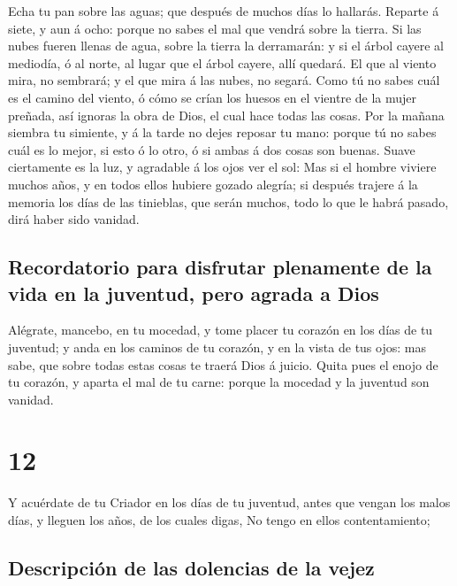  Echa tu pan sobre las aguas; que después de muchos días
lo hallarás.  Reparte á siete, y aun á ocho: porque no
sabes el mal que vendrá sobre la tierra.  Si las nubes
fueren llenas de agua, sobre la tierra la derramarán: y si el árbol
cayere al mediodía, ó al norte, al lugar que el árbol cayere, allí
quedará.  El que al viento mira, no sembrará; y el que
mira á las nubes, no segará.  Como tú no sabes cuál es el
camino del viento, ó cómo se crían los huesos en el vientre de la mujer
preñada, así ignoras la obra de Dios, el cual hace todas las cosas.
 Por la mañana siembra tu simiente, y á la tarde no dejes
reposar tu mano: porque tú no sabes cuál es lo mejor, si esto ó lo otro,
ó si ambas á dos cosas son buenas.  Suave ciertamente es
la luz, y agradable á los ojos ver el sol:  Mas si el
hombre viviere muchos años, y en todos ellos hubiere gozado alegría; si
después trajere á la memoria los días de las tinieblas, que serán
muchos, todo lo que le habrá pasado, dirá haber sido vanidad.

\hypertarget{recordatorio-para-disfrutar-plenamente-de-la-vida-en-la-juventud-pero-agrada-a-dios}{%
\subsection{Recordatorio para disfrutar plenamente de la vida en la
juventud, pero agrada a
Dios}\label{recordatorio-para-disfrutar-plenamente-de-la-vida-en-la-juventud-pero-agrada-a-dios}}

 Alégrate, mancebo, en tu mocedad, y tome placer tu
corazón en los días de tu juventud; y anda en los caminos de tu corazón,
y en la vista de tus ojos: mas sabe, que sobre todas estas cosas te
traerá Dios á juicio.  Quita pues el enojo de tu corazón,
y aparta el mal de tu carne: porque la mocedad y la juventud son
vanidad.

\hypertarget{section-11}{%
\section{12}\label{section-11}}

 Y acuérdate de tu Criador en los días de tu juventud,
antes que vengan los malos días, y lleguen los años, de los cuales
digas, No tengo en ellos contentamiento;

\hypertarget{descripciuxf3n-de-las-dolencias-de-la-vejez}{%
\subsection{Descripción de las dolencias de la
vejez}\label{descripciuxf3n-de-las-dolencias-de-la-vejez}}

